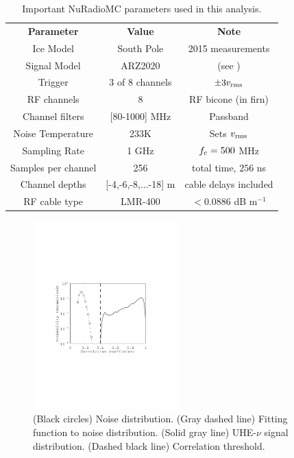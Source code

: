 \documentclass[amsmath,amssymb,aps,prd,10pt,twocolumn,showkeys]{revtex4}
\begin{document}
\begin{table}
\small
\centering
\begin{tabular}{| c | c | c |}
\hline
\textbf{Parameter} & \textbf{Value} & \textbf{Note} \\
Ice Model & South Pole & 2015 measurements \\
Signal Model & ARZ2020 & (see \cite{PhysRevD.101.083005}) \\
Trigger & 3 of 8 channels & $\pm 3v_{\rm rms}$ \\
RF channels & 8 & RF bicone (in firn) \\
Channel filters & [80-1000] MHz & Passband \\
Noise Temperature & 233K & Sets $v_{\rm rms}$ \\
Sampling Rate & 1 GHz & $f_{\rm c} = 500$ MHz \\
Samples per channel & 256 & total time, $256$ ns \\
Channel depths & [-4,-6,-8,...-18] m & cable delays included \\
RF cable type & LMR-400 & $<0.0886$ dB m$^{-1}$ \\
\hline
\end{tabular}
\caption{\label{tab:1} Important NuRadioMC parameters used in this analysis.}
\end{table}

\begin{figure}
\centering
\includegraphics[width=0.5\textwidth,trim=3.25cm 8.25cm 4.5cm 9.0cm,clip=true]{Aug15_plot1.pdf}
\caption{\label{fig:fig3} (Black circles) Noise distribution. (Gray dashed line) Fitting function to noise distribution.  (Solid gray line) UHE-$\nu$ signal distribution.  (Dashed black line) Correlation threshold.}
\end{figure}
\end{document}

